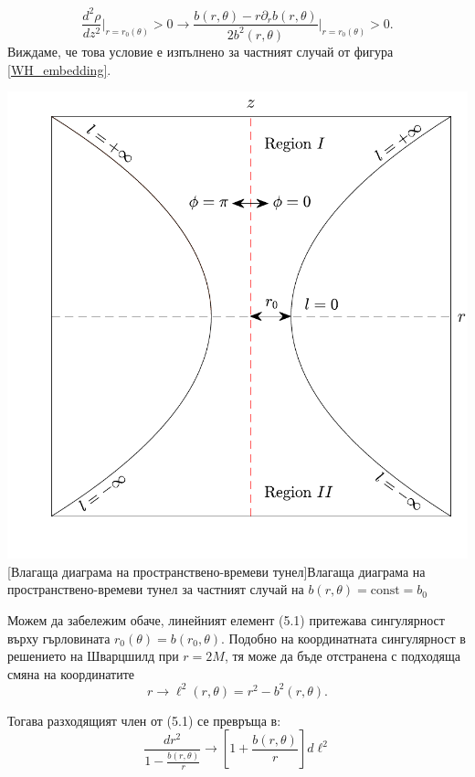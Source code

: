 \begin{equation}
	\frac{d^2\rho}{dz^2}\bigg\vert_{r = r_0(\theta)} > 0\rightarrow \frac{b(r,\theta) - r\partial_rb(r,\theta)}{2b^2(r,\theta)}\bigg\vert_{r = r_0(\theta)} > 0.
\end{equation}\newline
{}
Виждаме, че това условие е изпълнено за частният случай от фигура \ref{WH_embedding}.\\

\begin{minipage}{15em}
	\centering
	\hspace{-0.99cm}
	\includegraphics[scale = 0.4]{WH_embedding.pdf}
	[Влагаща диаграма на пространствено-времеви тунел]{\small Влагаща диаграма на пространствено-времеви тунел за частният случай на $b(r,\theta) = \text{const} = b_0$}
	\label{WH_embedding}
\end{minipage}
\begin{minipage}{16em}
	Можем да забележим обаче, линейният елемент (5.1) притежава сингулярност върху гърловината $r_0(\theta) = b(r_0,\theta)$. Подобно на координатната сингулярност в решението на Шварцшилд при $r = 2M$, тя може да бъде отстранена с подходяща смяна на координатите 
	\begin{equation}
	r	 \rightarrow \ell^2(r,\theta) = r^2 - b^2(r,\theta).
	\end{equation}
	
	Тогава разходящият член от (5.1) се превръща в:
	\begin{equation}
		\frac{dr^2}{1 - \frac{b(r,\theta)}{r}} \rightarrow \left[1 + \frac{b(r,\theta)}{r}\right]d\ell^2
	\end{equation}
	
\end{minipage}\\\newline
